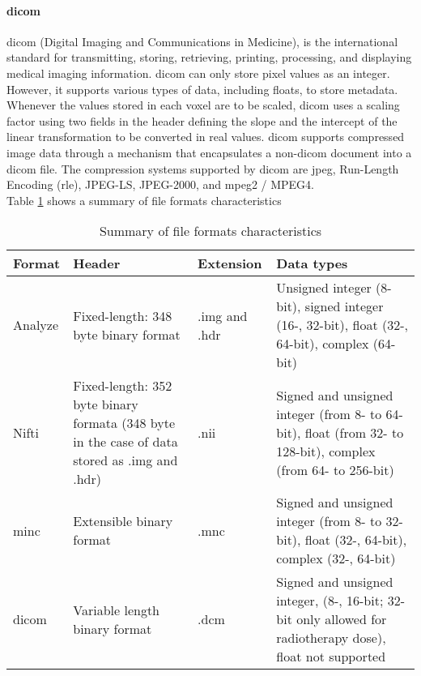 \paragraph{\acs{dicom}}
\acs{dicom} (Digital Imaging and Communications in Medicine), is the international standard for transmitting, storing, retrieving, printing, processing, and displaying medical imaging information. \acs{dicom} can only store pixel values ​​as an integer. However, it supports various types of data, including floats, to store metadata. Whenever the values ​​stored in each voxel are to be scaled, \acs{dicom} uses a scaling factor using two fields in the header defining the slope and the intercept of the linear transformation to be converted in real values. \acs{dicom} supports compressed image data through a mechanism that encapsulates a non-\acs{dicom} document into a \acs{dicom} file. The compression systems supported by \acs{dicom} are \acs{jpeg}, Run-Length Encoding (\acs{rle}), JPEG-LS, JPEG-2000, and \acs{mpeg}2 / MPEG4.\cite{DIC:1,ME:1}\\
Table \ref{me-file-format} shows a summary of file formats characteristics
\begin{table}[h]
\begin{center}
\begin{tabular}{l p{5cm} l p{5cm}}
\hline
\textbf{Format} & \textbf{Header}                                                                              & \textbf{Extension} & \textbf{Data types}                                                                                     \\ \hline
Analyze & Fixed-length: 348 byte binary format                                                         & .img and .hdr & Unsigned integer (8-bit), signed integer (16-, 32-bit), float (32-, 64-bit), complex (64-bit)               \\ \hline
Nifti   & Fixed-length: 352 byte binary formata (348 byte in the case of data stored as .img and .hdr) & .nii          & Signed and unsigned integer (from 8- to 64-bit), float (from 32- to 128-bit), complex (from 64- to 256-bit) \\ \hline
\acs{minc}    & Extensible binary format                                                                     & .mnc          & Signed and unsigned integer (from 8- to 32-bit), float (32-, 64-bit), complex (32-, 64-bit) \\ \hline
\acs{dicom}	& Variable length binary format	                                                               & .dcm	       & Signed and unsigned integer, (8-, 16-bit; 32-bit only allowed for radiotherapy dose), float not supported
\end{tabular}
\caption{Summary of file formats characteristics \cite{ME:1}}
\label{me-file-format}
\end{center}
\end{table}
